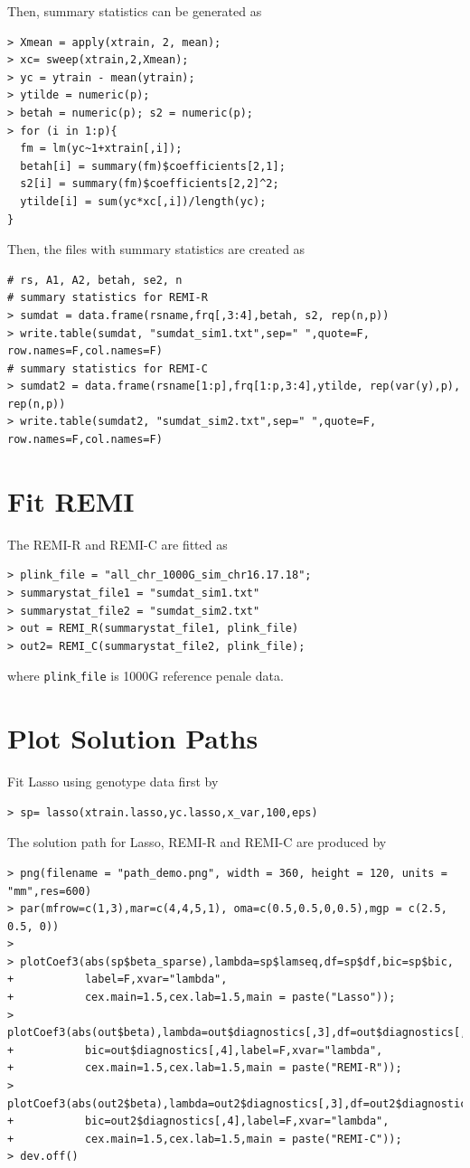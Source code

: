 \documentclass[11pt]{article}
\begin{document}
Then, summary statistics can be generated as
\begin{verbatim}
> Xmean = apply(xtrain, 2, mean);
> xc= sweep(xtrain,2,Xmean);
> yc = ytrain - mean(ytrain);
> ytilde = numeric(p);
> betah = numeric(p); s2 = numeric(p);
> for (i in 1:p){
  fm = lm(yc~1+xtrain[,i]);
  betah[i] = summary(fm)$coefficients[2,1];
  s2[i] = summary(fm)$coefficients[2,2]^2;
  ytilde[i] = sum(yc*xc[,i])/length(yc);
}
\end{verbatim}

Then, the files with summary statistics are created as

\begin{verbatim}
# rs, A1, A2, betah, se2, n
# summary statistics for REMI-R
> sumdat = data.frame(rsname,frq[,3:4],betah, s2, rep(n,p))
> write.table(sumdat, "sumdat_sim1.txt",sep=" ",quote=F, row.names=F,col.names=F)
# summary statistics for REMI-C
> sumdat2 = data.frame(rsname[1:p],frq[1:p,3:4],ytilde, rep(var(y),p), rep(n,p))
> write.table(sumdat2, "sumdat_sim2.txt",sep=" ",quote=F, row.names=F,col.names=F)
\end{verbatim}

\section{Fit REMI}
\label{REMIfit}
The REMI-R and REMI-C are fitted as
\begin{verbatim}
> plink_file = "all_chr_1000G_sim_chr16.17.18";
> summarystat_file1 = "sumdat_sim1.txt"
> summarystat_file2 = "sumdat_sim2.txt"
> out = REMI_R(summarystat_file1, plink_file)
> out2= REMI_C(summarystat_file2, plink_file);
\end{verbatim}
where \texttt{plink$\_$file} is 1000G reference penale data.

\section{Plot Solution Paths}
Fit Lasso using genotype data first by
\begin{verbatim}
> sp= lasso(xtrain.lasso,yc.lasso,x_var,100,eps)
\end{verbatim}
The solution path for Lasso, REMI-R and REMI-C are produced by
\begin{verbatim}
> png(filename = "path_demo.png", width = 360, height = 120, units = "mm",res=600)
> par(mfrow=c(1,3),mar=c(4,4,5,1), oma=c(0.5,0.5,0,0.5),mgp = c(2.5, 0.5, 0))
>
> plotCoef3(abs(sp$beta_sparse),lambda=sp$lamseq,df=sp$df,bic=sp$bic,
+           label=F,xvar="lambda",
+           cex.main=1.5,cex.lab=1.5,main = paste("Lasso"));
> plotCoef3(abs(out$beta),lambda=out$diagnostics[,3],df=out$diagnostics[,1],
+           bic=out$diagnostics[,4],label=F,xvar="lambda",
+           cex.main=1.5,cex.lab=1.5,main = paste("REMI-R"));
> plotCoef3(abs(out2$beta),lambda=out2$diagnostics[,3],df=out2$diagnostics[,1],
+           bic=out2$diagnostics[,4],label=F,xvar="lambda",
+           cex.main=1.5,cex.lab=1.5,main = paste("REMI-C"));
> dev.off()
\end{verbatim}
\end{document}
